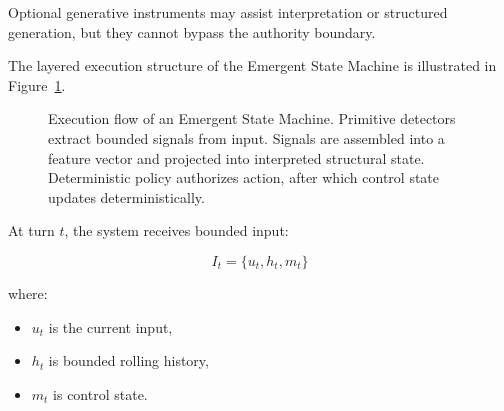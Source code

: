 \documentclass[11pt]{article}
\begin{document}
Optional generative instruments may assist interpretation or structured generation, but they cannot bypass the authority boundary.


The layered execution structure of the Emergent State Machine is illustrated in Figure~\ref{fig:esmflow}.

\begin{figure}[H]
\centering
{}

\caption{Execution flow of an Emergent State Machine. Primitive detectors extract bounded signals from input. Signals are assembled into a feature vector and projected into interpreted structural state. Deterministic policy authorizes action, after which control state updates deterministically.}
\label{fig:esmflow}
\end{figure}


At turn $t$, the system receives bounded input:

\[
I_t = \{u_t, h_t, m_t\}
\]

where:

\begin{itemize}
  \item $u_t$ is the current input,
  \item $h_t$ is bounded rolling history,
  \item $m_t$ is control state.
\end{itemize}
\end{document}
